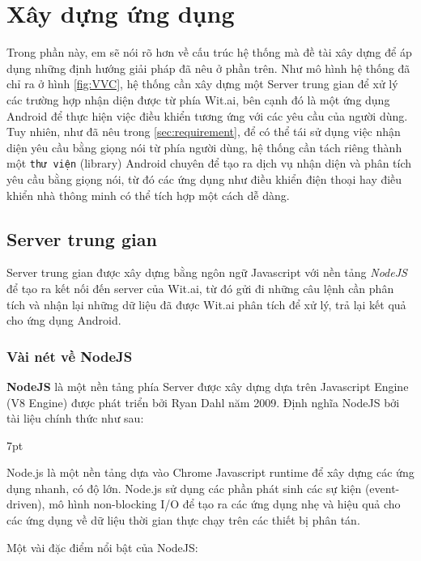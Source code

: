 \documentclass[12pt]{report}
\newenvironment{formal}{%
  \def\FrameCommand{%
    \hspace{1pt}%
    {\color{mygray}\vrule width 6pt}%
    {\color{lightgray}\vrule width 4pt}%
    \colorbox{lightgray}%
  }%
  \MakeFramed{\advance\hsize-\width\FrameRestore}%
  \noindent\hspace{-4.55pt}%
  \begin{adjustwidth}{}{7pt}%
  \vspace{2pt}\vspace{2pt}%
}
{%
  \vspace{2pt}\end{adjustwidth}\endMakeFramed%
}
\begin{document}
\section{Xây dựng ứng dụng}

Trong phần này, em sẽ nói rõ hơn về cấu trúc hệ thống mà đề tài xây dựng để áp dụng những định hướng giải pháp đã nêu ở phần trên. Như mô hình hệ thống đã chỉ ra ở hình \ref{fig:VVC}, hệ thống cần xây dựng một Server trung gian để xử lý các trường hợp nhận diện được từ phía Wit.ai, bên cạnh đó là một ứng dụng Android để thực hiện việc điều khiển tương ứng với các yêu cầu của người dùng. Tuy nhiên, như đã nêu trong \ref{sec:requirement}, để có thể tái sử dụng việc nhận diện yêu cầu bằng giọng nói từ phía người dùng, hệ thống cần tách riêng thành một \texttt{thư viện} (library) Android chuyên để tạo ra dịch vụ nhận diện và phân tích yêu cầu bằng giọng nói, từ đó các ứng dụng như điều khiển điện thoại hay điều khiển nhà thông minh có thể tích hợp một cách dễ dàng.

\subsection{Server trung gian}

Server trung gian được xây dựng bằng ngôn ngữ Javascript với nền tảng \textit{NodeJS} để tạo ra kết nối đến server của Wit.ai, từ đó gửi đi những câu lệnh cần phân tích và nhận lại những dữ liệu đã được Wit.ai phân tích để xử lý, trả lại kết quả cho ứng dụng Android.

\subsubsection{Vài nét về NodeJS}

\textbf{NodeJS} là một nền tảng phía Server được xây dựng dựa trên Javascript Engine (V8 Engine) được phát triển bởi Ryan Dahl năm 2009. Định nghĩa NodeJS bởi tài liệu chính thức như sau:

\begin{formal}
Node.js là một nền tảng dựa vào Chrome Javascript runtime để xây dựng các ứng dụng nhanh, có độ lớn. Node.js sử dụng các phần phát sinh các sự kiện (event-driven), mô hình non-blocking I/O để tạo ra các ứng dụng nhẹ và hiệu quả cho các ứng dụng về dữ liệu thời gian thực chạy trên các thiết bị phân tán.
\end{formal}

Một vài đặc điểm nổi bật của NodeJS:
\end{document}
